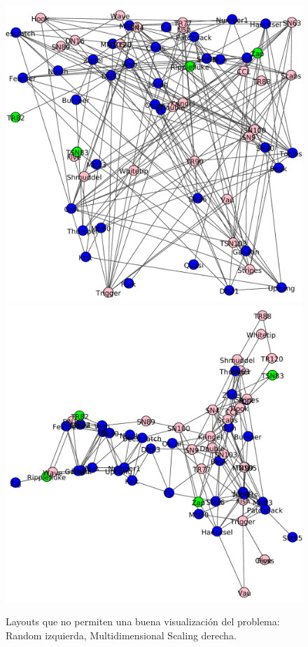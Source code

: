 \begin{figure}
\centering
\includegraphics[scale = 0.25]{figuras/Random-eps-converted-to.pdf}
\includegraphics[scale = 0.25]{figuras/Multi-eps-converted-to.pdf}
\caption{Layouts que no permiten una buena visualización del problema: Random izquierda, Multidimensional Scaling derecha.}
\label{fig:Layouts_malos}
\end{figure}


